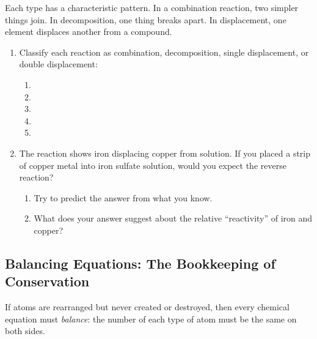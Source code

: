 \documentclass[12pt, a4paper]{book}
\theoremstyle{definition}
\begin{document}
\vspace{0.5em}

Each type has a characteristic pattern.
In a combination reaction, two simpler things join.
In decomposition, one thing breaks apart.
In displacement, one element displaces another from a compound.

\begin{problembox}
\begin{enumerate}[label=\textbf{\arabic*.}]
  \item Classify each reaction as combination, decomposition,
        single displacement, or double displacement:
        \begin{enumerate}[label=(\alph*)]
          \item {}
          \item {}
          \item {}
          \item {}
          \item {}
        \end{enumerate}

  \item The reaction 
        shows iron displacing copper from solution.
        If you placed a strip of copper metal into iron sulfate solution,
        would you expect the reverse reaction?
        \begin{enumerate}[label=(\alph*)]
          \item Try to predict the answer from what you know.
          \item What does your answer suggest about the
                relative ``reactivity'' of iron and copper?
        \end{enumerate}
\end{enumerate}
\end{problembox}

\subsection{Balancing Equations: The Bookkeeping of Conservation}

If atoms are rearranged but never created or destroyed,
then every chemical equation must \emph{balance}:
the number of each type of atom must be the same on both sides.
\end{document}
